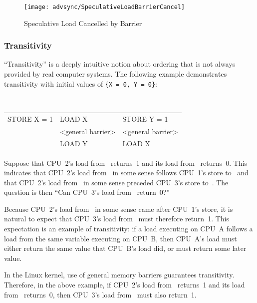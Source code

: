 \begin{enumerate}
\begin{figure}[htbp]
\centering
\texttt{[image: advsync/SpeculativeLoadBarrierCancel]}
\caption{Speculative Load Cancelled by Barrier}
\end{figure}

\subsubsection{Transitivity}
\label{sec:advsync:Transitivity}

``Transitivity'' is a deeply intuitive notion about ordering that is not
always provided by real computer systems.  The following example
demonstrates transitivity with initial values of
{\tt \{X~=~0, Y~=~0\}}:

\vspace{5pt}
\begin{minipage}[t]{\columnwidth}
\tt
\scriptsize
\begin{tabular}{l|l|l}
	\nf{CPU 1}	& \nf{CPU 2}		& \nf{CPU 3} \\
	\hline
	STORE X = 1	& LOAD X		& STORE Y = 1 \\
			& <general barrier>	& <general barrier> \\
			& LOAD Y		& LOAD X \\
\end{tabular}
\end{minipage}
\vspace{5pt}

Suppose that CPU~2's load from~ returns~1 and its load from~ returns~0.
This indicates that CPU~2's load from~ in some sense follows CPU~1's
store to~ and that CPU~2's load from~ in some sense preceded CPU~3's
store to~.  The question is then ``Can CPU~3's load from~ return~0?''

Because CPU~2's load from~ in some sense came after CPU~1's store, it
is natural to expect that CPU~3's load from~ must therefore return~1.
This expectation is an example of transitivity: if a load executing on
CPU~A follows a load from the same variable executing on CPU~B, then
CPU~A's load must either return the same value that CPU~B's load did,
or must return some later value.

In the Linux kernel, use of general memory barriers guarantees
transitivity.  Therefore, in the above example, if CPU~2's load from~
returns~1 and its load from~ returns~0, then CPU~3's load from~ must
also return~1.


\end{enumerate}
